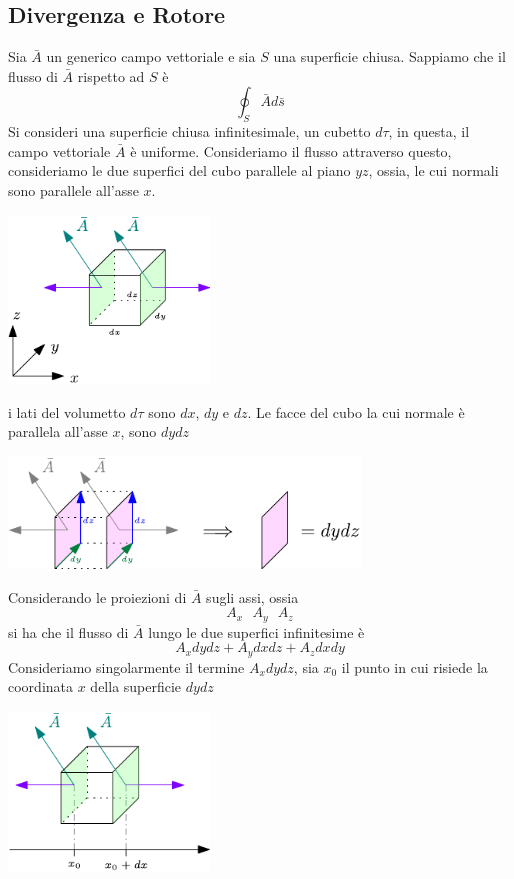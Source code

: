 \documentclass[10pt, letterpaper]{report}
\begin{document}
\subsection{Divergenza e Rotore}
Sia $\bar A$ un generico campo vettoriale e sia $S$ una superficie chiusa. Sappiamo che il flusso di $\bar A$ rispetto ad $S$ è
$$\oint_S \bar A d\bar s $$ 
Si consideri una superficie chiusa infinitesimale, un cubetto $d\tau$, in questa, il campo vettoriale $\bar A$ è uniforme. Consideriamo il flusso attraverso questo, consideriamo le due superfici del cubo parallele al piano $yz$, ossia, le cui normali sono parallele all'asse $x$.\begin{center}
    \includegraphics[width=0.4\textwidth]{images/Cubetto.pdf}
\end{center}
i lati del volumetto $d\tau$ sono $dx$, $dy$ e $dz$. Le facce del cubo la cui normale è parallela all'asse $x$, sono $dydz$\begin{center}
    \includegraphics[width=0.7\textwidth]{images/Cubetto2.pdf}
\end{center}
Considerando le proiezioni di $\bar A$ sugli assi, ossia $$ A_x \ \ \ A_y \ \ \ A_z$$
si ha che il flusso di $\bar A$ lungo le due superfici infinitesime  è 
$$ A_xdydz+A_ydxdz+A_zdxdy$$
Consideriamo singolarmente il termine $A_xdydz$, sia $x_0$ il punto in cui risiede la coordinata $x$ della superficie $dydz$\begin{center}
    \includegraphics[width=0.4\textwidth]{images/Cubetto3.pdf}
\end{center}
\end{document}
